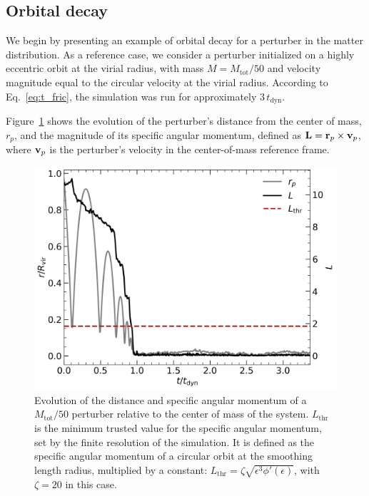 \documentclass[twocolumn, a4paper]{article}
\begin{document}
\subsection{Orbital decay}

We begin by presenting an example of orbital decay for a perturber in the matter distribution. As a reference case, we consider a perturber initialized on a highly eccentric orbit at the virial radius, with mass \(M = M_\text{tot} / 50\) and velocity magnitude equal to the circular velocity at the virial radius. According to Eq.~\ref{eq:t_fric}, the simulation was run for approximately \(3\, t_\text{dyn}\).

Figure~\ref{fig:pert_dist_l} shows the evolution of the perturber’s distance from the center of mass, \(r_p\), and the magnitude of its specific angular momentum, defined as \(\vb{L} = \vb{r}_p \times \vb{v}_p\), where \(\vb{v}_p\) is the perturber's velocity in the center-of-mass reference frame.

\begin{figure}
    \centering
    \includegraphics[width=\columnwidth]{images/pert_dist_l.png}
    \caption{Evolution of the distance and specific angular momentum of a \(M_\text{tot} / 50\) perturber relative to the center of mass of the system. \(L_\text{thr}\) is the minimum trusted value for the specific angular momentum, set by the finite resolution of the simulation. It is defined as the specific angular momentum of a circular orbit at the smoothing length radius, multiplied by a constant: \(L_\text{thr} = \zeta \sqrt{\epsilon^3 \phi'(\epsilon)}\), with \(\zeta = 20\) in this case.}
    \label{fig:pert_dist_l}
\end{figure}
\end{document}

